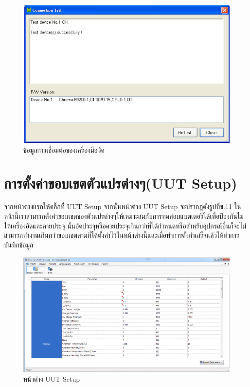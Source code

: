\begin{center}
	\begin{figure}[H]
		\includegraphics[width=1\linewidth]{Chapters/img/17020_Program/HW_Configulation/Connection_test.png}
		\centering
		\captionsetup{justification=centering,margin=2cm}
		\caption{ข้อมูลการเชื่อมต่อของเครื่องมือวัด}
	\end{figure}
\end{center}
\section{การตั้งค่าขอบเขตตัวแปรต่างๆ(UUT Setup)}
จากหน้าต่างแรกให้คลิ๊กที่ UUT Setup จากนั้นหน้าต่าง UUT Setup จะปรากฎดังรูปที่ข.11 ในหน้านี้เราสามารถตั้งค่าขอบเขตของตัวแปรต่างๆให้เหมาะสมกับการทดสอบแบตเตอรี่ได้เพื่อป้องกันไม่ให้เครื่องอัดและคายประจุ
นั้นอัดประจุหรือคายประจุเกินกว่าที่ได้กำหนดหรือสำหรับอุปกรณ์อื่นก็จะไม่สามารถทำงานเกินกว่าขอบเขตตามที่ได้ตั้งค่าไว้ในหน้าต่างนี้และเมื่อทำการตั้งค่าเสร็จแล้วให้ทำการบันทึกข้อมูล
\begin{center}
	\begin{figure}[H]
		\includegraphics[width=1\linewidth]{Chapters/img/17020_Program/UUT/UUT_setup_win.png}
		\centering
		\captionsetup{justification=centering,margin=2cm}
		\caption{หน้าต่าง UUT Setup}
	\end{figure}
\end{center}
